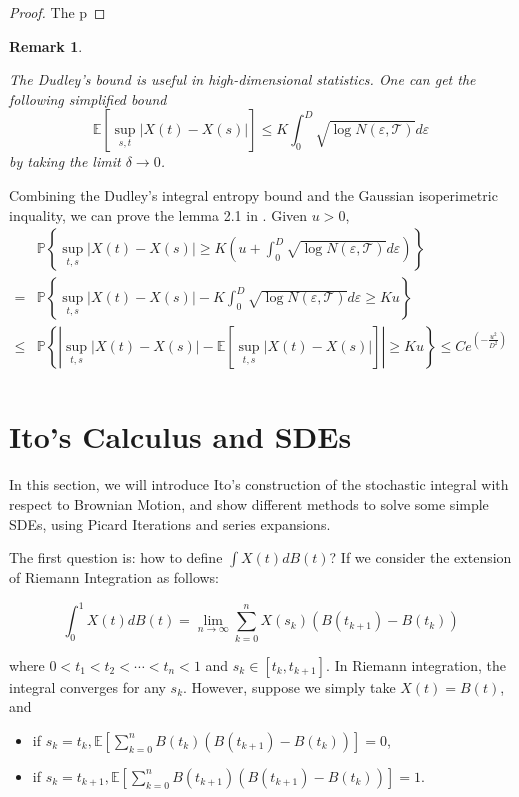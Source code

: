 \documentclass[11pt,english]{smfart}
\newtheorem{remark}[theorem]{Remark}
\newcommand{\mb}{\mathbb}
\begin{document}
\begin{proof}
    The p
\end{proof}

\begin{remark}
    \begin{enumerate}
        The Dudley's bound is useful in high-dimensional statistics. One can get the following simplified bound $$\mb{E}\left[\sup_{s,t}|X(t)-X(s)|\right] \leq K\int_0^D \sqrt{\log N(\varepsilon,\mathcal{T})}d\varepsilon$$ by taking the limit $\delta \rightarrow 0$.
    \end{enumerate}
\end{remark}



Combining the Dudley's integral entropy bound and the Gaussian isoperimetric inquality, we can prove the lemma 2.1 in \cite{Talagrand-hausdorfffbM}. Given $u>0$,
\begin{align*}
    &\mb{P}\left\{\sup_{t,s}|X(t)-X(s)| \geq K\left(u + \int_0^D \sqrt{\log N(\varepsilon,\mathcal{T})}d\varepsilon\right) \right\}\\
    = &\mb{P}\left\{\sup_{t,s}|X(t)-X(s)| - K\int_0^D \sqrt{\log N(\varepsilon,\mathcal{T})}d\varepsilon \geq Ku \right\}\\
    \leq &\mb{P}\left\{\left|\sup_{t,s}|X(t)-X(s)| -\mb{E}\left[\sup_{t,s}|X(t)-X(s)|\right] \right|\geq Ku \right\} \leq Ce^{\left(-\frac{u^2}{D^2}\right)}\\
\end{align*}

\newpage
\section{Ito's Calculus and SDEs}
In this section, we will introduce Ito's construction of the stochastic integral with respect to Brownian Motion, and show different methods to solve some simple SDEs, using Picard Iterations and series expansions.



The first question is: how to define $\int X(t)dB(t)$? If we consider the extension of Riemann Integration as follows: 

$$\int_0^1 X(t) dB(t) = \lim_{n\rightarrow \infty} \sum_{k=0}^n X(s_k) (B(t_{k+1}) - B(t_k))$$

where $0< t_1 <t_2 < \cdots < t_n < 1$ and $s_k \in [t_k,t_{k+1}]$. In Riemann integration, the integral converges for any $s_k$. However, suppose we simply take $X(t) = B(t)$, and 
\begin{itemize}
    \item if $s_k = t_k, \mb{E}\left[\sum_{k=0}^n B(t_k)\left(B(t_{k+1}) -B(t_k)\right)\right] = 0$,
    \item  if $s_k = t_{k+1}, \mb{E} \left[ \sum_{k=0}^n B(t_{k+1}) \left(B(t_{k+1}) - B(t_k)\right)\right] = 1$.
\end{itemize}
\end{document}

